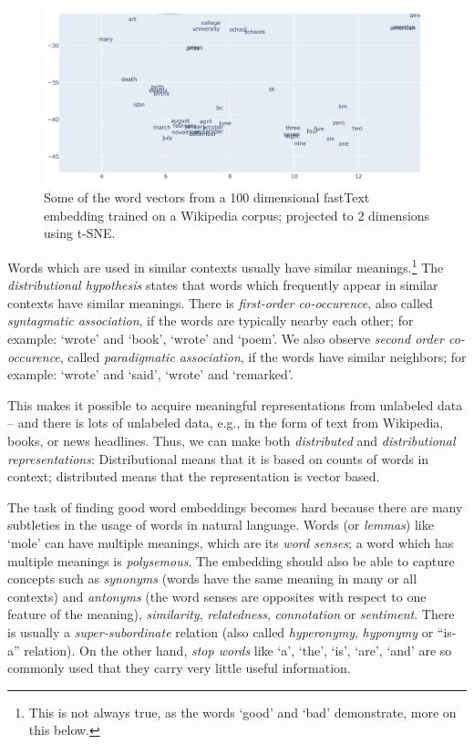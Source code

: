 \documentclass[11pt, a4paper]{amsart}
\begin{document}
\begin{figure}[H]
    \centering
    \includegraphics[width=\linewidth]{pictures/fastText_tSNE_screenshot.png}
    \caption{Some of the word vectors from a 100 dimensional fastText embedding trained on a Wikipedia corpus; projected to 2 dimensions using t-SNE.}
    \label{fig:fastText_tSNE}
\end{figure}

Words which are used in similar contexts usually have similar meanings.\footnote{This is not always true, as the words `good' and `bad' demonstrate, more on this below.}
The \emph{distributional hypothesis} states that words which frequently appear in similar contexts have similar meanings.
There is \emph{first-order co-occurence}, also called \emph{syntagmatic association}, if the words are typically nearby each other; for example: `wrote' and `book', `wrote' and `poem'.
We also observe \emph{second order co-occurence}, called \emph{paradigmatic association}, if the words have similar neighbors; for example: `wrote' and `said', `wrote' and `remarked'.

This makes it possible to acquire meaningful representations from unlabeled data -- and there is lots of unlabeled data, e.g., in the form of text from Wikipedia, books, or news headlines.
Thus, we can make both \emph{distributed} and \emph{distributional representations}:
Distributional means that it is based on counts of words in context;
distributed means that the representation is vector based.

The task of finding good word embeddings becomes hard because there are many subtleties in the usage of words in natural language.
Words (or \emph{lemmas}) like `mole' can have multiple meanings, which are its \emph{word senses}; a word which has multiple meanings is \emph{polysemous}.
The embedding should also be able to capture concepts such as \emph{synonyms} (words have the same meaning in many or all contexts) and \emph{antonyms} (the word senses are opposites with respect to one feature of the meaning), \emph{similarity}, \emph{relatedness}, \emph{connotation} or \emph{sentiment}.
There is usually a \emph{super-subordinate} relation (also called \emph{hyperonymy}, \emph{hyponymy} or ``is-a'' relation).
On the other hand, \emph{stop words} like `a', `the', `is', `are', `and' are so commonly used that they carry very little useful information.
\end{document}
